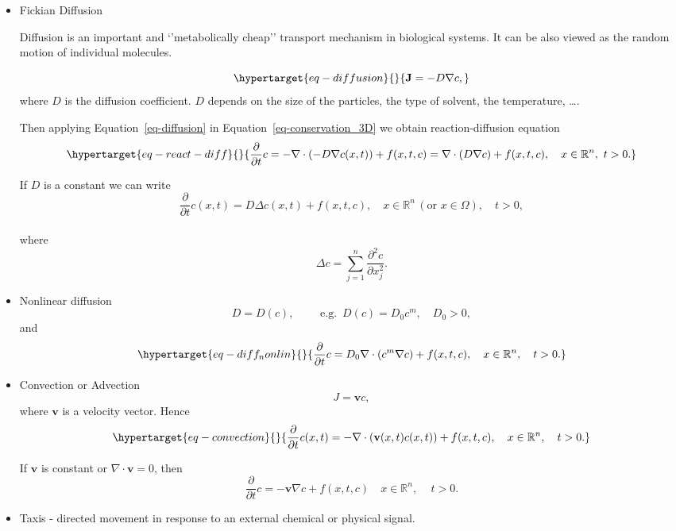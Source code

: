 \documentclass[
  letterpaper,
  DIV=11,
  numbers=noendperiod]{scrreprt}
\theoremstyle{plain}
\theoremstyle{definition}
\theoremstyle{plain}
\theoremstyle{remark}
\begin{document}
\begin{itemize}
\item
  Fickian Diffusion

  Diffusion is an important and `'metabolically cheap'' transport
  mechanism in biological systems. It can be also viewed as the random
  motion of individual molecules.

  \begin{equation}\protect\hypertarget{eq-diffusion}{}{
  {\mathbf{J}} = - D\nabla c,
  }\label{eq-diffusion}\end{equation} where \(D\) is the diffusion
  coefficient. \(D\) depends on the size of the particles, the type of
  solvent, the temperature, \ldots.

  Then applying Equation~\ref{eq-diffusion} in
  Equation~\ref{eq-conservation_3D} we obtain reaction-diffusion
  equation \begin{equation}\protect\hypertarget{eq-react-diff}{}{
  \frac{\partial}{\partial t} c =  - \nabla\cdot ( - D \nabla c(x,t))+  f(x,t ,c) = \nabla \cdot ( D \nabla c) + f(x,t ,c),
  \quad x\in \mathbb R^n, \,  \, t >0.
  }\label{eq-react-diff}\end{equation}

  If \(D\) is a constant we can write \[
  \frac{\partial}{\partial t} c(x,t) =  D \Delta c(x,t) + f(x,t ,c),
  \quad x\in \mathbb R^n \,  (\text{or } x \in \Omega), \quad t >0, 
  \]\\
  where \[
  \Delta c = \sum\limits_{j=1}^n \dfrac{\partial^2 c}{\partial x_j^2}.
  \]
\item
  Nonlinear diffusion \[
  D = D(c) , \qquad \text{ e.g. }\,   D(c)= D_0 c^m, \quad D_0 >0, 
  \] and \begin{equation}\protect\hypertarget{eq-diff_nonlin}{}{
    \frac{\partial}{\partial t} c = D_0 \nabla\cdot (c^m \nabla c) + f(x,t ,c),
  \quad x\in \mathbb R^n,  \quad t >0.
  }\label{eq-diff_nonlin}\end{equation}
\item
  Convection or Advection \[ 
  J = \textbf{v} c,
  \] where \(\textbf{v}\) is a velocity vector. Hence
  \begin{equation}\protect\hypertarget{eq-convection}{}{
  \frac{\partial}{\partial t} c(x,t) = - \nabla\cdot (\textbf{v}(x,t) c(x,t))  + f(x,t ,c),
  \quad x\in \mathbb R^n,   \quad t >0. 
  }\label{eq-convection}\end{equation}

  If \(\textbf{v}\) is constant or \(\nabla \cdot \textbf{v} = 0\), then
  \[
  \frac{\partial}{\partial t} c = - \textbf{v} \nabla c  + f(x,t ,c)
  \quad x\in \mathbb R^n, \,  \quad t >0.
  \]
\item
  Taxis - directed movement in response to an external chemical or
  physical signal.


\end{itemize}
\end{document}
